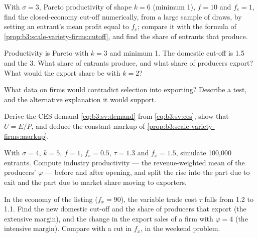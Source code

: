 \begin{exercise}[$\star\star$]\label{exo:b3:scale-variety-firms:7}
With $\sigma = 3$, Pareto productivity of shape $k = 6$ (minimum 1), $f = 10$ and $f_e =
1$, find the closed-economy cut-off numerically, from a large sample of draws,
by setting an entrant's mean profit equal to $f_e$; compare it with the formula
of \cref{prop:b3:scale-variety-firms:cutoff}, and find the share of entrants that
produce.
\end{exercise}

\begin{exercise}[$\star\star$]\label{exo:b3:scale-variety-firms:8}
Productivity is Pareto with $k = 3$ and minimum 1. The domestic cut-off is 1.5 and
the  3. What share of entrants produce, and what share of
producers export? What would the export share be with $k = 2$?
\end{exercise}

\begin{exercise}[$\star\star$]\label{exo:b3:scale-variety-firms:9}
What data on firms would contradict selection into exporting? Describe a test,
and the alternative explanation it would support.
\end{exercise}

\begin{exercise}[$\star\star\star$]\label{exo:b3:scale-variety-firms:10}
Derive the CES demand \eqref{eq:b3:sv:demand} from \eqref{eq:b3:sv:ces}, show that
$U = E/P$, and deduce the constant markup of
\cref{prop:b3:scale-variety-firms:markup}.
\end{exercise}

\begin{exercise}[$\star\star\star$]\label{exo:b3:scale-variety-firms:11}
With $\sigma = 4$, $k = 5$, $f = 1$, $f_e = 0.5$, $\tau = 1.3$ and $f_x = 1.5$, simulate
100{,}000 entrants. Compute industry productivity --- the revenue-weighted mean of
the producers' $\varphi$ --- before and after opening, and split the rise into the
part due to exit and the part due to market share moving to exporters.
\end{exercise}

\begin{exercise}[$\star\star\star$]\label{exo:b3:scale-variety-firms:12}
In the economy of the listing ($f_x = 90$), the variable trade cost $\tau$ falls from
1.2 to 1.1. Find the new domestic cut-off and the share of producers that export
(the extensive margin), and the change in the export sales of a firm with $\varphi = 4$
(the intensive margin). Compare with a cut in $f_x$, in the weekend problem.
\end{exercise}

